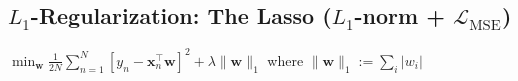 
\subsection*{$L_{1}$-Regularization: The Lasso ($L_{1}$-norm + $\mathcal{L}_{\text{MSE}}$)}
$\min _{\mathbf{w}} \frac{1}{2 N} \sum_{n=1}^{N}[y_{n}-\mathbf{x}_{n}^{\top} \mathbf{w}]^{2}+\lambda\|\mathbf{w}\|_{1}$
where $
\|\mathbf{w}\|_{1}:=\sum_{i}|w_{i}|
$





